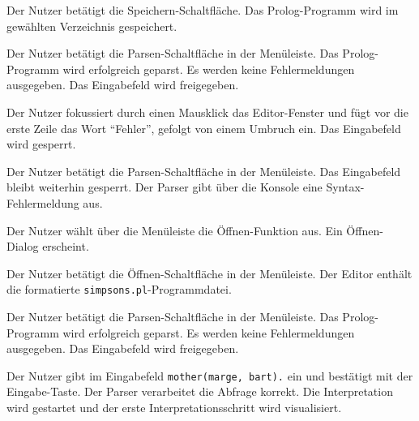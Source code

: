 \documentclass[parskip=full,11pt,twoside]{scrartcl}
\begin{document}
{Der Nutzer betätigt die Speichern-Schaltfläche.}
{Das Prolog-Programm wird im gewählten Verzeichnis gespeichert.}

{Der Nutzer betätigt die Parsen-Schaltfläche in der Menüleiste.}
{Das Prolog-Programm wird erfolgreich geparst. Es werden keine Fehlermeldungen ausgegeben. Das Eingabefeld wird freigegeben.}

{Der Nutzer fokussiert durch einen Mausklick das Editor-Fenster und fügt vor die erste Zeile das Wort \enquote{Fehler}, gefolgt von einem Umbruch ein.}
{Das Eingabefeld wird gesperrt.}

{Der Nutzer betätigt die Parsen-Schaltfläche in der Menüleiste.}
{Das Eingabefeld bleibt weiterhin gesperrt. Der Parser gibt über die Konsole eine Syntax-Fehlermeldung aus.}


{Der Nutzer wählt über die Menüleiste die Öffnen-Funktion aus.}
{Ein Öffnen-Dialog erscheint.}

{Der Nutzer betätigt die Öffnen-Schaltfläche in der Menüleiste.}
{Der Editor enthält die formatierte \texttt{simpsons.pl}-Programmdatei.}

{Der Nutzer betätigt die Parsen-Schaltfläche in der Menüleiste.}
{Das Prolog-Programm wird erfolgreich geparst. Es werden keine Fehlermeldungen ausgegeben. Das Eingabefeld wird freigegeben.}

{Der Nutzer gibt im Eingabefeld \texttt{mother(marge, bart).} ein und bestätigt mit der Eingabe-Taste.}
{Der Parser verarbeitet die Abfrage korrekt. Die Interpretation wird gestartet und der erste Interpretationsschritt wird visualisiert.}
\end{document}
